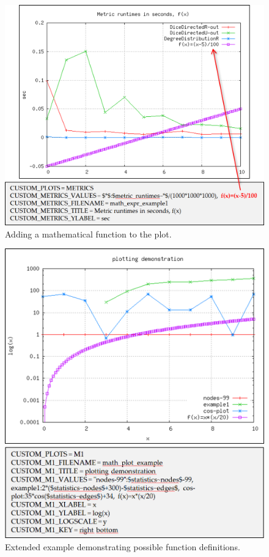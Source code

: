 \begin{figure} [h]
\centering
\includegraphics [scale=0.5] {images/311}
\caption{Adding a mathematical function to the plot.}
\label{fig:311}
\end{figure}

\begin{figure} [h]
\centering
\includegraphics [scale=0.5] {images/312}
\caption{Extended example demonstrating possible function definitions.}
\label{fig:312}
\end{figure}